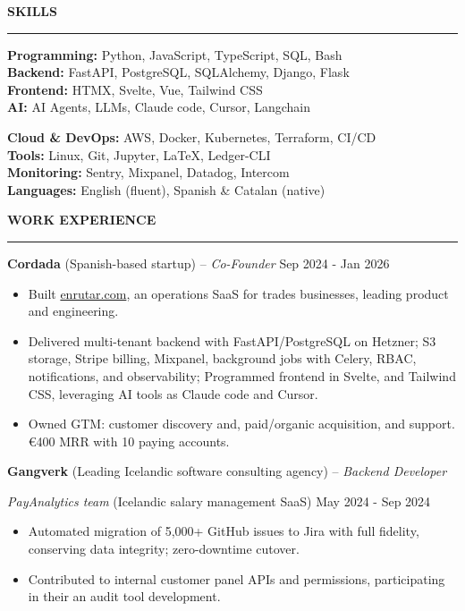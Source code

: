 \documentclass[10pt,a4paper,ragged2e]{altacv}
\renewcommand{\cvsection}[2][]{%
  \bigskip%
  {\color{heading}\large\bfseries\MakeUppercase{#2}}\\[-1ex]%
  {\color{heading}\rule{\linewidth}{0.5pt}\par}\medskip
}
\newcommand{\cvjob}[4]{%
  \textbf{#1} {\small(#4)} -- \textit{#2} \hfill {\small #3}\par\smallskip
}
\newcommand{\cvsubentry}[3]{%
  \hspace{0.5em}\textit{#1} {\small(#2)} \hfill {\small #3}\par\smallskip
}
\begin{document}
\cvsection{Skills}
{\small
\begin{minipage}[t]{0.48\linewidth}
\textbf{Programming:} Python, JavaScript, TypeScript, SQL, Bash\\
\textbf{Backend:} FastAPI, PostgreSQL, SQLAlchemy, Django, Flask \\
\textbf{Frontend:} HTMX, Svelte, Vue, Tailwind CSS\\
\textbf{AI:} AI Agents, LLMs, Claude code, Cursor, Langchain\\
\end{minipage}%
\hfill
\begin{minipage}[t]{0.48\linewidth}
\textbf{Cloud \& DevOps:} AWS, Docker, Kubernetes, Terraform, CI/CD\\
\textbf{Tools:} Linux, Git, Jupyter, LaTeX, Ledger-CLI\\
\textbf{Monitoring:} Sentry, Mixpanel, Datadog, Intercom\\
\textbf{Languages:} English (fluent), Spanish \& Catalan (native)\\
\end{minipage}
}

\cvsection{Work Experience}

\cvjob{Cordada}{Co-Founder}{Sep 2024 - Jan 2026}{Spanish-based startup}
{\small
\begin{itemize}[nosep,topsep=0pt,parsep=0pt,partopsep=0pt,leftmargin=*]
\item Built \href{https://enrutar.com}{enrutar.com}, an operations SaaS for trades businesses, leading product and engineering.
\item Delivered multi-tenant backend with FastAPI/PostgreSQL on Hetzner; S3 storage, Stripe billing, Mixpanel, background jobs with Celery, RBAC, notifications, and observability; Programmed frontend in Svelte, and Tailwind CSS, leveraging AI tools as Claude code and Cursor.
\item Owned GTM: customer discovery and, paid/organic acquisition, and support. €400 MRR with 10 paying accounts.
\end{itemize}
}\medskip

\cvjob{Gangverk}{Backend Developer}{}{Leading Icelandic software consulting agency}

\cvsubentry{PayAnalytics team}{Icelandic salary management SaaS}{May 2024 - Sep 2024}
{\small
\begin{itemize}[nosep,topsep=0pt,parsep=0pt,partopsep=0pt,leftmargin=*]
\item Automated migration of 5,000+ GitHub issues to Jira with full fidelity, conserving data integrity; zero-downtime cutover.
\item Contributed to internal customer panel APIs and permissions, participating in their an audit tool development.
\end{itemize}
}\smallskip
\end{document}
